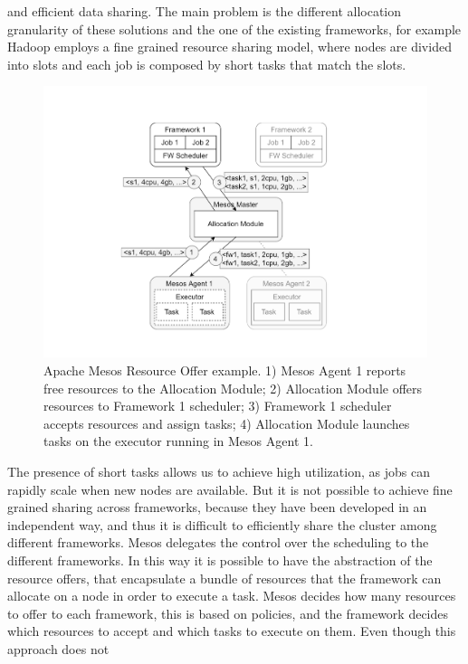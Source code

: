 and efficient data sharing. The main problem is the different allocation
granularity of these solutions and the one of the existing frameworks,
for example Hadoop employs a fine grained resource sharing
model, where nodes are divided into slots and each job is composed
by short tasks that match the slots.
\begin{figure}
	\centering
	\includegraphics[width=\columnwidth]{Images/apache_mesos_resource_offer_example.pdf}  
	\caption[Apache Mesos Resource Offer Example]{Apache Mesos Resource Offer example. 1) Mesos Agent 1 reports
		free resources to the Allocation Module; 2) Allocation
		Module offers resources to Framework 1 scheduler; 3) Framework
		1 scheduler accepts resources and assign tasks; 4) Allocation
		Module launches tasks on the executor running in Mesos
		Agent 1.}
	\label{fig:apacheMesosResourceOfferExample}
\end{figure}
The presence of short tasks allows
us to achieve high utilization, as jobs can rapidly scale when
new nodes are available. But it is not possible to achieve fine grained
sharing across frameworks, because they have been developed in an
independent way, and thus it is difficult to efficiently share the cluster
among different frameworks.
Mesos delegates the control over the scheduling to the different
frameworks. In this way it is possible to have the abstraction of the
resource offers, that encapsulate a bundle of resources that the framework
can allocate on a node in order to execute a task. Mesos decides
how many resources to offer to each framework, this is based on
policies, and the framework decides which resources to accept and
which tasks to execute on them. Even though this approach does not
